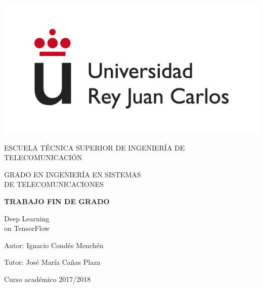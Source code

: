 \begin{titlepage}
	\begin{center}
		\vspace*{7.7mm}
		\includegraphics[width=0.4\linewidth]{images/logo}
		\vspace{6.5mm}
		
		\fontsize{15.5}{14}\selectfont ESCUELA TÉCNICA SUPERIOR DE INGENIERÍA DE TELECOMUNICACIÓN
		\vspace{13mm}
		
		\fontsize{14}{14}\selectfont GRADO EN INGENIERÍA EN SISTEMAS \\ DE TELECOMUNICACIONES
		
		\vspace{70pt}
		
		\fontsize{15.7}{14}\selectfont \textbf{TRABAJO FIN DE GRADO}
		
		\vspace{25mm}
		\begin{huge}
			Deep Learning \\ on TensorFlow
		\end{huge}
		
		\vspace{25mm}
		
		\begin{large}
			Autor: Ignacio Condés Menchén

			Tutor: José María Cañas Plaza
		\end{large}
		\begin{normalsize}
			
			Curso académico 2017/2018
		\end{normalsize}
		\vspace{10mm}
	\end{center}
\end{titlepage}

\pagebreak
\thispagestyle{empty}
\vspace*{12cm}

